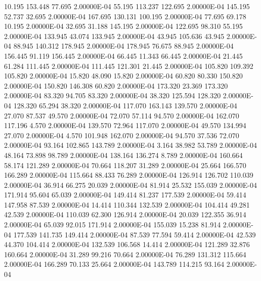     10.195   153.448    77.695  2.00000E-04
    55.195   113.237   122.695  2.00000E-04
   145.195    52.737    32.695  2.00000E-04
   167.695   130.131   100.195  2.00000E-04
    77.695    69.178    10.195  2.00000E-04
    32.695    31.188   145.195  2.00000E-04
   122.695    98.310    55.195  2.00000E-04
   133.945    43.074   133.945  2.00000E-04
    43.945   105.636    43.945  2.00000E-04
    88.945   140.312   178.945  2.00000E-04
   178.945    76.675    88.945  2.00000E-04
   156.445    91.119   156.445  2.00000E-04
    66.445    11.343    66.445  2.00000E-04
    21.445    61.284   111.445  2.00000E-04
   111.445   121.301    21.445  2.00000E-04
   105.820   109.392   105.820  2.00000E-04
    15.820    48.090    15.820  2.00000E-04
    60.820    80.330   150.820  2.00000E-04
   150.820   146.308    60.820  2.00000E-04
   173.320    23.369   173.320  2.00000E-04
    83.320    94.705    83.320  2.00000E-04
    38.320   125.594   128.320  2.00000E-04
   128.320    65.294    38.320  2.00000E-04
   117.070   163.143   139.570  2.00000E-04
    27.070    87.537    49.570  2.00000E-04
    72.070    57.114    94.570  2.00000E-04
   162.070   117.196     4.570  2.00000E-04
   139.570    72.964   117.070  2.00000E-04
    49.570   134.994    27.070  2.00000E-04
     4.570   101.948   162.070  2.00000E-04
    94.570    37.536    72.070  2.00000E-04
    93.164   102.865   143.789  2.00000E-04
     3.164    38.982    53.789  2.00000E-04
    48.164    73.898    98.789  2.00000E-04
   138.164   136.274     8.789  2.00000E-04
   160.664    58.174   121.289  2.00000E-04
    70.664   118.207    31.289  2.00000E-04
    25.664   166.570   166.289  2.00000E-04
   115.664    88.433    76.289  2.00000E-04
   126.914   126.702   110.039  2.00000E-04
    36.914    66.275    20.039  2.00000E-04
    81.914    25.532   155.039  2.00000E-04
   171.914    95.604    65.039  2.00000E-04
   149.414    81.237   177.539  2.00000E-04
    59.414   147.958    87.539  2.00000E-04
    14.414   110.344   132.539  2.00000E-04
   104.414    49.281    42.539  2.00000E-04
   110.039    62.300   126.914  2.00000E-04
    20.039   122.355    36.914  2.00000E-04
    65.039    92.015   171.914  2.00000E-04
   155.039    15.238    81.914  2.00000E-04
   177.539   141.735   149.414  2.00000E-04
    87.539    77.594    59.414  2.00000E-04
    42.539    44.370   104.414  2.00000E-04
   132.539   106.568    14.414  2.00000E-04
   121.289    32.876   160.664  2.00000E-04
    31.289    99.216    70.664  2.00000E-04
    76.289   131.312   115.664  2.00000E-04
   166.289    70.133    25.664  2.00000E-04
   143.789   114.215    93.164  2.00000E-04
